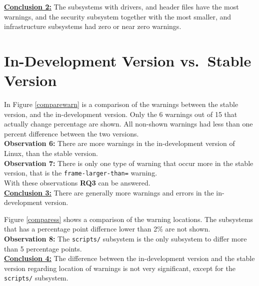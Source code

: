 \documentclass[a4paper,11pt]{report}
\begin{document}
\underline{\textbf{Conclusion 2:}}
The subsystems with drivers, and header files have the most warnings, and the 
security subsystem together with the most smaller, and infrastructure subsystems
had zero or near zero warnings.




            \section{In-Development Version vs.\ Stable Version}


In Figure \ref{comparewarn} is a comparison of the warnings between the stable
version, and the in-development version. Only the 6 warnings out of 15 that 
actually change percentage are shown. All non-shown warnings had less than one 
percent difference between the two versions.
\\

\textbf{Observation 6:}
There are more warnings in the in-development version of Linux, than the stable
version.
\\

\textbf{Observation 7:}
There is only one type of warning that occur more in the stable version, that is
the \texttt{frame-larger-than=} warning.
\\

With these observations \textbf{RQ3} can be answered.
\\

\underline{\textbf{Conclusion 3:}}
There are generally more warnings and errors in the in-development version.


Figure \ref{comparess} shows a comparison of the warning locations. The 
subsystems that has a percentage point differnce lower than 2\% are not 
shown.
\\

\textbf{Observation 8:}
The \texttt{scripts/} subsystem is the only subsystem to differ more than 5 percentage points.
\\

\underline{\textbf{Conclusion 4:}}
The difference between the in-development version and the stable version regarding location of warnings is
not very significant, except for the \texttt{scripts/} subsystem.
\end{document}
